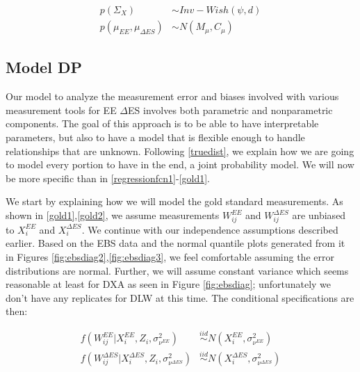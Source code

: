 \documentclass[11pt]{article}\usepackage[]{graphicx}\usepackage[]{color}
\begin{document}
\begin{align}
   p(\Sigma_X) &\sim Inv-Wish(\psi,d)\\
   p(\mu_{EE},\mu_{\Delta ES}) &\sim N(M_{\mu},C_{\mu}) 
\end{align}







\subsection{Model DP}

Our model to analyze the measurement error and biases involved with various measurement tools for EE $\Delta$ES involves both parametric and nonparametric components. The goal of this approach is to be able to have interpretable parameters, but also to have a model that is flexible enough to handle relationships  that are unknown. Following \eqref{truedist}, we explain how we are going to model every portion to have in the end, a joint probability model. We will now be more specific than in \eqref{regressionfcn1}-\eqref{gold1}.

We start by explaining how we will model the gold standard measurements. As shown in \eqref{gold1},\eqref{gold2}, we assume measurements $W_{ij}^{EE}$ and $W_{ij}^{\Delta ES}$ are unbiased to $X_i^{EE}$ and $X_i^{\Delta ES}$. We continue with our independence assumptions described earlier. Based on the EBS data and the normal quantile plots generated from it in Figures \eqref{fig:ebsdiag2},\eqref{fig:ebsdiag3}, we feel comfortable assuming the error distributions are normal. Further, we will assume constant variance which seems reasonable at least for DXA as seen in Figure \eqref{fig:ebsdiag}; unfortunately we don't have any replicates for DLW at this time. The conditional specifications are then:

\begin{align}
  f(W_{ij}^{EE}|X_i^{EE},Z_i,\sigma_{\nu^{EE}}^2) &\overset{iid}{\sim} N(X_i^{EE},\sigma_{\nu^{EE}}^2) \\
    f(W_{ij}^{\Delta ES}|X_i^{\Delta ES},Z_i,\sigma_{\nu^{\Delta ES}}^2) &\overset{iid}{\sim} N(X_i^{\Delta ES},\sigma_{\nu^{\Delta ES}}^2) \\
\end{align}
\end{document}
